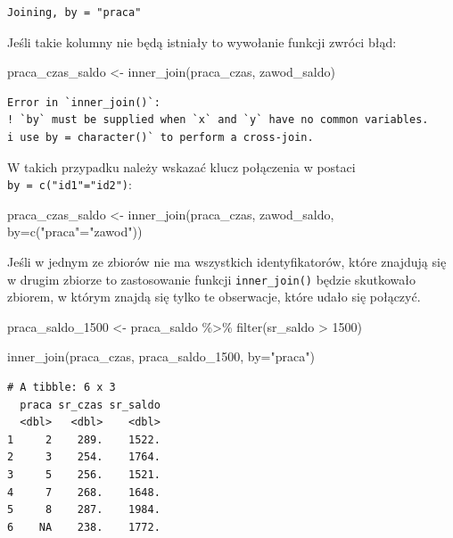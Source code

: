\documentclass[
  letterpaper,
  DIV=11,
  numbers=noendperiod]{scrreprt}
\newenvironment{Shaded}{\begin{snugshade}}{\end{snugshade}}
\newcommand{\AttributeTok}[1]{\textcolor[rgb]{0.40,0.45,0.13}{#1}}
\newcommand{\DecValTok}[1]{\textcolor[rgb]{0.68,0.00,0.00}{#1}}
\newcommand{\FunctionTok}[1]{\textcolor[rgb]{0.28,0.35,0.67}{#1}}
\newcommand{\NormalTok}[1]{\textcolor[rgb]{0.00,0.23,0.31}{#1}}
\newcommand{\OtherTok}[1]{\textcolor[rgb]{0.00,0.23,0.31}{#1}}
\newcommand{\SpecialCharTok}[1]{\textcolor[rgb]{0.37,0.37,0.37}{#1}}
\newcommand{\StringTok}[1]{\textcolor[rgb]{0.13,0.47,0.30}{#1}}
\begin{document}
\begin{verbatim}
Joining, by = "praca"
\end{verbatim}

Jeśli takie kolumny nie będą istniały to wywołanie funkcji zwróci błąd:

\begin{Shaded}
\begin{Highlighting}[]
\NormalTok{praca\_czas\_saldo }\OtherTok{\textless{}{-}} \FunctionTok{inner\_join}\NormalTok{(praca\_czas, zawod\_saldo)}
\end{Highlighting}
\end{Shaded}

\begin{verbatim}
Error in `inner_join()`:
! `by` must be supplied when `x` and `y` have no common variables.
i use by = character()` to perform a cross-join.
\end{verbatim}

W takich przypadku należy wskazać klucz połączenia w postaci
\texttt{by\ =\ c("id1"="id2")}:

\begin{Shaded}
\begin{Highlighting}[]
\NormalTok{praca\_czas\_saldo }\OtherTok{\textless{}{-}} \FunctionTok{inner\_join}\NormalTok{(praca\_czas, zawod\_saldo, }\AttributeTok{by=}\FunctionTok{c}\NormalTok{(}\StringTok{"praca"}\OtherTok{=}\StringTok{"zawod"}\NormalTok{))}
\end{Highlighting}
\end{Shaded}

Jeśli w jednym ze zbiorów nie ma wszystkich identyfikatorów, które
znajdują się w drugim zbiorze to zastosowanie funkcji
\texttt{inner\_join()} będzie skutkowało zbiorem, w którym znajdą się
tylko te obserwacje, które udało się połączyć.

\begin{Shaded}
\begin{Highlighting}[]
\NormalTok{praca\_saldo\_1500 }\OtherTok{\textless{}{-}}\NormalTok{ praca\_saldo }\SpecialCharTok{\%\textgreater{}\%}
  \FunctionTok{filter}\NormalTok{(sr\_saldo }\SpecialCharTok{\textgreater{}} \DecValTok{1500}\NormalTok{)}

\FunctionTok{inner\_join}\NormalTok{(praca\_czas, praca\_saldo\_1500, }\AttributeTok{by=}\StringTok{"praca"}\NormalTok{)}
\end{Highlighting}
\end{Shaded}

\begin{verbatim}
# A tibble: 6 x 3
  praca sr_czas sr_saldo
  <dbl>   <dbl>    <dbl>
1     2    289.    1522.
2     3    254.    1764.
3     5    256.    1521.
4     7    268.    1648.
5     8    287.    1984.
6    NA    238.    1772.
\end{verbatim}
\end{document}
